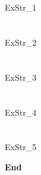 \documentclass[a4paper, leqno, 12pt]{article} %
\newenvironment{top_enumerate}{
\begin{enumerate}
  \setlength{\itemsep}{2em}
  \setlength{\topsep}{-0pt}
  \setlength{\partopsep}{-0pt}
}{\end{enumerate}}
\begin{document}
\section*{}

\begin{top_enumerate}

ExStr_1

\end{top_enumerate}

\bigskip
\section*{}

\begin{top_enumerate}

ExStr_2

\end{top_enumerate}

\bigskip
\section*{}

\begin{top_enumerate}

ExStr_3

\end{top_enumerate}

\bigskip
\section*{}

\begin{top_enumerate}

ExStr_4

\end{top_enumerate}

\bigskip
\section*{}

\begin{top_enumerate}

ExStr_5

\end{top_enumerate}

\rfoot{}                %
\begin{flushright}      %
\textbf{End}
\end{flushright}
\end{document}
